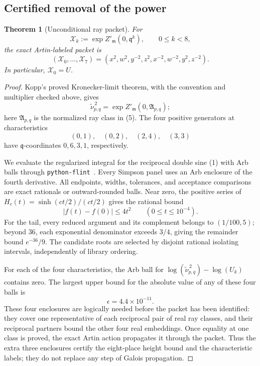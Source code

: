 \documentclass[11pt]{article}
\newtheorem{theorem}{Theorem}
\begin{document}
\subsection{Certified removal of the power}

\begin{theorem}[Unconditional ray packet]\label{thm:packet}
For
\[
 \mathcal X_k:=\exp Z'_{\mathfrak m}(0,\mathfrak q^k),
 \qquad 0\le k<8,
\]
the exact Artin-labeled packet is
\[
(\mathcal X_0,\ldots,\mathcal X_7)
=(x^2,w^2,y^{-2},z^2,x^{-2},w^{-2},y^2,z^{-2}).
\tag{15}
\]
In particular, $\mathcal X_0=U$.
\end{theorem}

\begin{proof}
Kopp's proved Kronecker-limit theorem, with the convention and
multiplier checked above, gives
\[
 \widetilde\nu_{p,q}^{\,2}
 =\exp Z'_{\mathfrak m}(0,\mathfrak A_{p,q});
\tag{16}
\]
here $\mathfrak A_{p,q}$ is the normalized ray class in (5).
The four positive generators at characteristics
\[
 (0,1),\quad(0,2),\quad(2,4),\quad(3,3)
\]
have $\mathfrak q$-coordinates $0,6,3,1$, respectively.

We evaluate the regularized integral for the reciprocal double sine
(1) with Arb balls through \texttt{python-flint}~\cite{pythonflint}.
Every Simpson panel uses an Arb enclosure of the
fourth derivative.  All endpoints, widths, tolerances, and acceptance
comparisons are exact rationals or outward-rounded balls.  Near zero,
the positive series of
$H_c(t)=\sinh(ct/2)/(ct/2)$ gives the rational bound
\[
 |f(t)-f(0)|\le4t^2\qquad(0\le t\le10^{-4}).
\]
For the tail, every reduced argument and its complement belongs to
$(1/100,5)$; beyond $36$, each exponential denominator exceeds
$3/4$, giving the remainder bound $e^{-36}/9$.
The candidate roots are selected by disjoint rational isolating
intervals, independently of library ordering.

For each of the four characteristics, the Arb ball for
$\log(\widetilde\nu_{p,q}^{\,2})-\log(U_k)$ contains zero.  The largest
upper bound for the absolute value of any of these four balls is
\[
 \epsilon=4.4\times10^{-11}.
\]
These four enclosures are logically needed before the packet has been
identified: they cover one representative of each reciprocal pair of
real ray classes, and their reciprocal partners bound the other four
real embeddings.  Once equality at one class is proved, the exact Artin
action propagates it through the packet.  Thus the extra three
enclosures certify the eight-place height bound and the characteristic
labels; they do not replace any step of Galois propagation.


\end{proof}
\end{document}
